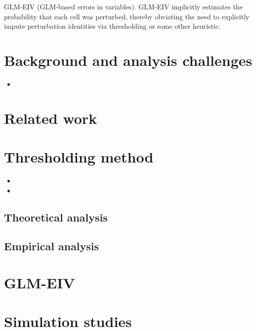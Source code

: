 \documentclass[12pt]{article}
\begin{document}

GLM-EIV (GLM-based errors in variables). GLM-EIV implicitly estimates the probability that each cell was perturbed, thereby obviating the need to explicitly impute perturbation identities via thresholding or some other heuristic. 


\section{Background and analysis challenges}

\begin{itemize}
\item 
\end{itemize}

\section{Related work}

\section{Thresholding method}

\begin{itemize}
\item 
\item 
\end{itemize}

\subsection{Theoretical analysis}

\subsection{Empirical analysis}

\section{GLM-EIV}

\section{Simulation studies}
\end{document}
